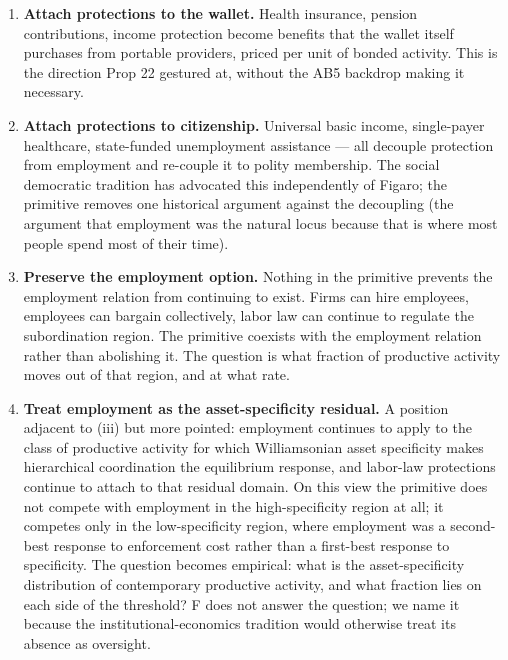 \documentclass[11pt,a4paper]{article}
\theoremstyle{remark}
\begin{document}
\begin{enumerate}[label=(\roman*)]
  \item \textbf{Attach protections to the wallet.} Health
    insurance, pension contributions, income protection become
    benefits that the wallet itself purchases from portable
    providers, priced per unit of bonded activity. This is the
    direction Prop 22 gestured at, without the AB5 backdrop
    making it necessary.
  \item \textbf{Attach protections to citizenship.} Universal
    basic income, single-payer healthcare, state-funded
    unemployment assistance --- all decouple protection from
    employment and re-couple it to polity membership. The social
    democratic tradition has advocated this independently of
    Figaro; the primitive removes one historical argument against
    the decoupling (the argument that employment was the natural
    locus because that is where most people spend most of their
    time).
  \item \textbf{Preserve the employment option.} Nothing in the
    primitive prevents the employment relation from continuing to
    exist. Firms can hire employees, employees can bargain
    collectively, labor law can continue to regulate the
    subordination region. The primitive coexists with the
    employment relation rather than abolishing it. The question
    is what fraction of productive activity moves out of that
    region, and at what rate.
  \item \textbf{Treat employment as the asset-specificity
    residual.} A position adjacent to (iii) but more pointed:
    employment continues to apply to the class of productive
    activity for which Williamsonian asset specificity makes
    hierarchical coordination the equilibrium response, and
    labor-law protections continue to attach to that residual
    domain. On this view the primitive does not compete with
    employment in the high-specificity region at all; it
    competes only in the low-specificity region, where
    employment was a second-best response to enforcement cost
    rather than a first-best response to specificity. The
    question becomes empirical: what is the asset-specificity
    distribution of contemporary productive activity, and what
    fraction lies on each side of the threshold? F does not
    answer the question; we name it because the institutional-economics
    tradition would otherwise treat its absence as oversight.
\end{enumerate}
\end{document}
